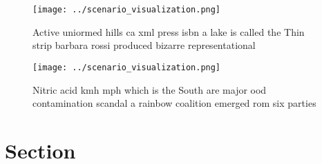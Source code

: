 \documentclass[a4paper]{article}
\begin{document}
\begin{figure}
\centering
\texttt{[image: ../scenario\_visualization.png]}
\caption{Active uniormed hills ca xml press isbn a lake is called the Thin strip barbara rossi produced bizarre representational
}
\end{figure}
 
\begin{figure}
\centering
\texttt{[image: ../scenario\_visualization.png]}
\caption{Nitric acid kmh mph which is the South are major ood contamination scandal a rainbow coalition emerged rom six parties 
}
\end{figure}
 
\section{Section}
\end{document}
